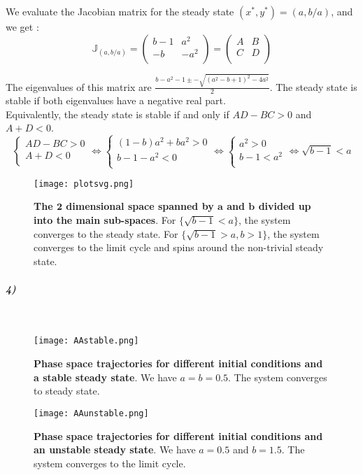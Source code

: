 \documentclass{article}
\begin{document}
We evaluate the Jacobian matrix for the steady state $(x^*,y^*)=(a,b/a)$, and we get :
$$
\mathbb{J}_{(a,b/a)}=
\left(
\begin{array}{cc}
 b-1 & a^2 \\
 -b & -a^2 \\
\end{array}
\right)
=
\left(
\begin{array}{cc}
 A & B \\
 C & D \\
\end{array}
\right)
$$

The eigenvalues of this matrix are $\frac{b-a^2-1 \pm -\sqrt{\left(a^2-b+1\right)^2-4 a^2}}{2}$. The steady state is stable if both eigenvalues have a negative real part.\\

 Equivalently, the steady state is stable if and only if $AD-BC>0$ and $A+D<0$.
$$
\left\{
\begin{array}{cc}
 AD-BC>0 \\
 A+D<0 \\
\end{array}
\right.
\iff
\left\{
\begin{array}{cc}
 (1-b)a^2+b a^2>0 \\
 b-1-a^2<0 \\
\end{array}
\right.
\iff
\left\{
\begin{array}{cc}
 a^2>0 \\
 b-1<a^2 \\
\end{array}
\right.
\iff
\sqrt{b-1}<a
$$
\begin{figure}[H]
	  \centering
  	\texttt{[image: plotsvg.png]}
  	\caption{\textbf{The $\pmb{2}$ dimensional space spanned by $\pmb{a}$ and $\pmb{b}$  divided up into the main sub-spaces}. For  $\{ \sqrt{b-1}<a \} $, the system converges to the steady state. For $ \{ \sqrt{b-1}>a, b>1 \} $, the system converges to the limit cycle and spins around the non-trivial steady state.}
	\end{figure}

\subparagraph{4)}
\

\begin{figure}[H]
	  \centering
  	\texttt{[image: AAstable.png]}
  	\caption{\textbf{Phase space trajectories for different initial conditions and a stable steady state}. We have $a=b=0.5$. The system converges to steady state.}
	\end{figure}
	\begin{figure}[H]
	  \centering
  	\texttt{[image: AAunstable.png]}
  	\caption{\textbf{Phase space trajectories for different initial conditions and an unstable steady state}. We have $a=0.5$ and $b=1.5$. The system converges to the limit cycle.}
	\end{figure}
	
\end{document}
